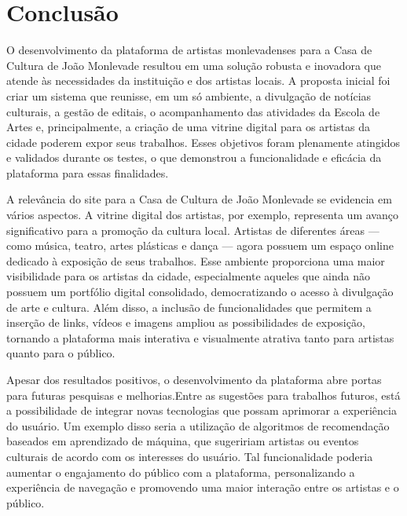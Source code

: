 \chapter[Conclusão]{Conclusão}

O desenvolvimento da plataforma de artistas monlevadenses para a Casa de Cultura de João Monlevade resultou em uma solução robusta e inovadora que atende às necessidades da instituição e dos artistas locais. A proposta inicial foi criar um sistema que reunisse, em um só ambiente, a divulgação de notícias culturais, a gestão de editais, o acompanhamento das atividades da Escola de Artes e, principalmente, a criação de uma vitrine digital para os artistas da cidade poderem expor seus trabalhos. Esses objetivos foram plenamente atingidos e validados durante os testes, o que demonstrou a funcionalidade e eficácia da plataforma para essas finalidades.

A relevância do site para a Casa de Cultura de João Monlevade se evidencia em vários aspectos. A vitrine digital dos artistas, por exemplo, representa um avanço significativo para a promoção da cultura local. Artistas de diferentes áreas — como música, teatro, artes plásticas e dança — agora possuem um espaço online dedicado à exposição de seus trabalhos. Esse ambiente proporciona uma maior visibilidade para os artistas da cidade, especialmente aqueles que ainda não possuem um portfólio digital consolidado, democratizando o acesso à divulgação de arte e cultura. Além disso, a inclusão de funcionalidades que permitem a inserção de links, vídeos e imagens ampliou as possibilidades de exposição, tornando a plataforma mais interativa e visualmente atrativa tanto para artistas quanto para o público.

Apesar dos resultados positivos, o desenvolvimento da plataforma abre portas para futuras pesquisas e melhorias.Entre as sugestões para trabalhos futuros, está a possibilidade de integrar novas tecnologias que possam aprimorar a experiência do usuário. Um exemplo disso seria a utilização de algoritmos de recomendação baseados em aprendizado de máquina, que sugeririam artistas ou eventos culturais de acordo com os interesses do usuário. Tal funcionalidade poderia aumentar o engajamento do público com a plataforma, personalizando a experiência de navegação e promovendo uma maior interação entre os artistas e o público.

